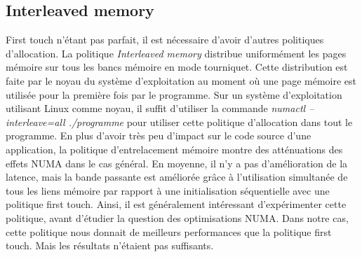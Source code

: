 \subsection{Interleaved memory}
First touch n'étant pas parfait, il est nécessaire d'avoir d'autres politiques d'allocation.
%
La politique {\em Interleaved memory} distribue uniformément les pages mémoire sur tous les bancs mémoire en mode tourniquet.
%
Cette distribution est faite par le noyau du système d'exploitation au moment où une page mémoire est utilisée pour la première fois par le programme.
%
Sur un système d'exploitation utilisant Linux comme noyau, il suffit d'utiliser la commande {\em numactl --interleave=all ./programme} pour utiliser cette politique d'allocation dans tout le programme.
%
En plus d'avoir très peu d'impact sur le code source d'une application, la politique d'entrelacement mémoire montre des atténuations des effets NUMA dans le cas général.
%
En moyenne, il n'y a pas d'amélioration de la latence, mais la bande passante est améliorée grâce à l'utilisation simultanée de tous les liens mémoire par rapport à une initialisation séquentielle avec une politique first touch.
%
Ainsi, il est généralement intéressant d'expérimenter cette politique, avant d'étudier la question des optimisations NUMA.
%
Dans notre cas, cette politique nous donnait de meilleurs performances que la politique first touch.
%
Mais les résultats n'étaient pas suffisants.
